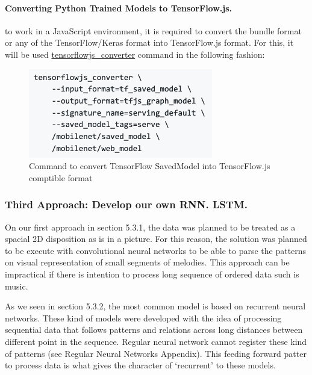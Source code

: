 \paragraph{Converting Python Trained Models to TensorFlow.js.} to work in a JavaScript
environment, it is required to convert the bundle format or any of the TensorFlow/Keras
format into TensorFlow.js format. For this, it will be used \url{tensorflowjs_converter}
command in the following fashion:

\begin{figure}[h!]
  \includegraphics[width=\linewidth]{image/fig_JDF10.png}
  \caption{Command to convert TensorFlow SavedModel into TensorFlow.js comptible format}
\end{figure}

\subsubsection{Third Approach: Develop our own RNN. LSTM.}

On our first approach in section 5.3.1, the data was planned to be treated as a spacial
2D disposition as is in a picture. For this reason, the solution was planned to be
execute with convolutional neural networks to be able to parse the patterns on visual
representation of small segments of melodies. This approach can be impractical if
there is intention to process long sequence of ordered data such is music.

As we seen in section 5.3.2, the most common model is based on recurrent neural
networks. These kind of models were developed with the idea of processing sequential
data that follows patterns and relations across long distances between different point
in the sequence. Regular neural network cannot register these kind of patterns (see
Regular Neural Networks Appendix). This feeding forward patter to process data is
what gives the character of ‘recurrent’ to these models.

